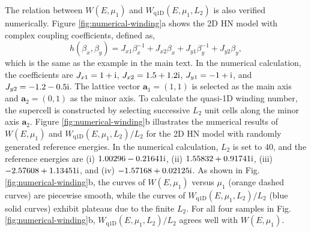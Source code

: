 \documentclass[pdflatex,sn-nature, iicol]{sn-jnl}%
\theoremstyle{thmstyleone}%
\theoremstyle{thmstyletwo}%
\theoremstyle{thmstylethree}%
\begin{document}
The relation between $W(E,\mu_{1})$ and $W_{\text{q1D}}(E,\mu_{1},L_{2})$
is also verified numerically. Figure \ref{fig:numerical-winding}a
shows the 2D HN model with complex coupling coefficients, defined
as, 
\begin{equation}
h\left(\beta_{x},\beta_{y}\right)=J_{x1}\beta_{x}^{-1}+J_{x2}\beta_{x}+J_{y1}\beta_{y}^{-1}+J_{y2}\beta_{y},
\end{equation}
which is the same as the example in the main text. In the numerical
calculation, the coefficients are $J_{x1}=1+\mathrm{i}$, $J_{x2}=1.5+1.2\mathrm{i}$,
$J_{y1}=-1+\mathrm{i}$, and $J_{y2}=-1.2-0.5\mathrm{i}$. The lattice vector
$\mathbf{a}_{1}=(1,1)$ is selected as the main axis and $\mathbf{a}_{2}=(0,1)$
as the minor axis. To calculate the quasi-1D winding number, the supercell
is constructed by selecting successive $L_{2}$ unit cells along the
minor axis $\mathbf{a}_{2}$. Figure \ref{fig:numerical-winding}b
illustrates the numerical results of $W(E,\mu_{1})$ and $W_{\text{q1D}}(E,\mu_{1},L_{2})/L_{2}$
for the 2D HN model with randomly generated reference energies. In
the numerical calculation, $L_{2}$ is set to $40$, and the reference
energies are (i) $1.00296-0.21641\mathrm{i}$, (ii) $1.55832+0.91741\mathrm{i}$,
(iii) $-2.57608+1.13451\mathrm{i}$, and (iv) $-1.57168+0.02125\mathrm{i}$. As
shown in Fig. \ref{fig:numerical-winding}b, the curves of $W(E,\mu_{1})$
versus $\mu_{1}$ (orange dashed curves) are piecewise smooth, while
the curves of $W_{\text{q1D}}(E,\mu_{1},L_{2})/L_{2}$ (blue solid
curves) exhibit plateaus due to the finite $L_{2}$. For all four
samples in Fig. \ref{fig:numerical-winding}b, $W_{\text{q1D}}(E,\mu_{1},L_{2})/L_{2}$
agrees well with $W(E,\mu_{1})$.
\end{document}
